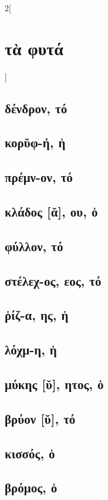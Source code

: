 \documentclass{book}
\begin{document}
\begin{multicols}{2}[\section{τὰ φυτά}]
\subsection{δένδρον, τό}
\subsection{κορῠφ-ή, ἡ}
\subsection{πρέμν-ον, τό}
\subsection{κλάδος [ᾰ], ου, ὁ}
\subsection{φύλλον, τό}
\subsection{στέλεχ-ος, εος, τό}
\subsection{ῥίζ-α, ης, ἡ}
\subsection{λόχμ-η, ἡ}
\subsection{μύκης [ῠ], ητος, ὁ}
\subsection{βρύον [ῠ], τό}
\subsection{κισσός, ὁ}
\subsection{βρόμος, ὁ}

\end{multicols}
\end{document}
